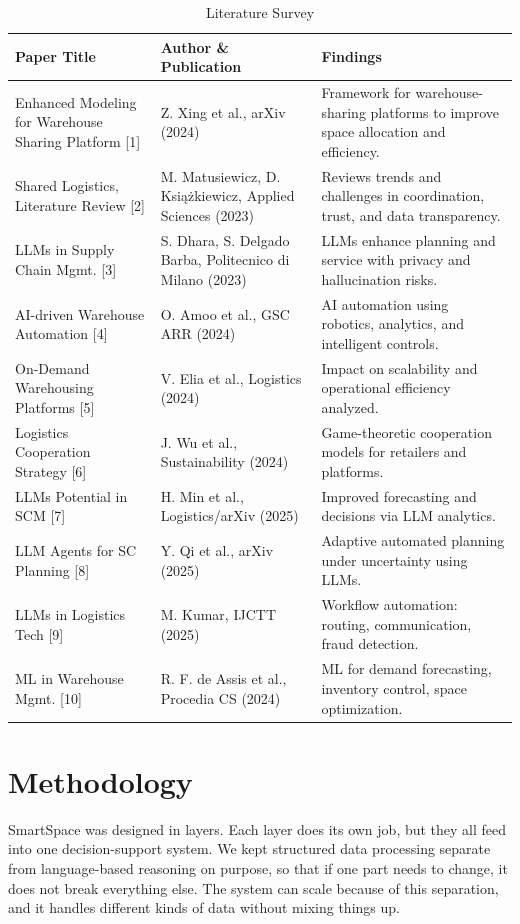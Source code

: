 \documentclass[conference]{IEEEtran}
\begin{document}
\begin{table}[!htbp]
\caption{Literature Survey}
\label{tab:literature_survey}
\centering
\footnotesize
\renewcommand{\arraystretch}{1.2}
\setlength{\tabcolsep}{3pt}
\begin{tabularx}{\columnwidth}{|p{}|p{}|p{}|}
\hline
\textbf{Paper Title} & \textbf{Author \& Publication} & \textbf{Findings} \\
\hline
Enhanced Modeling for Warehouse Sharing Platform [1]
& Z. Xing et al., arXiv (2024)
& Framework for warehouse-sharing platforms to improve space allocation and efficiency. \\
\hline
Shared Logistics, Literature Review [2]
& M. Matusiewicz, D. Ksi\k{a}\.zkiewicz, Applied Sciences (2023)
& Reviews trends and challenges in coordination, trust, and data transparency. \\
\hline
LLMs in Supply Chain Mgmt. [3]
& S. Dhara, S. Delgado Barba, Politecnico di Milano (2023)
& LLMs enhance planning and service with privacy and hallucination risks. \\
\hline
AI-driven Warehouse Automation [4]
& O. Amoo et al., GSC ARR (2024)
& AI automation using robotics, analytics, and intelligent controls. \\
\hline
On-Demand Warehousing Platforms [5]
& V. Elia et al., Logistics (2024)
& Impact on scalability and operational efficiency analyzed. \\
\hline
Logistics Cooperation Strategy [6]
& J. Wu et al., Sustainability (2024)
& Game-theoretic cooperation models for retailers and platforms. \\
\hline
LLMs Potential in SCM [7]
& H. Min et al., Logistics/arXiv (2025)
& Improved forecasting and decisions via LLM analytics. \\
\hline
LLM Agents for SC Planning [8]
& Y. Qi et al., arXiv (2025)
& Adaptive automated planning under uncertainty using LLMs. \\
\hline
LLMs in Logistics Tech [9]
& M. Kumar, IJCTT (2025)
& Workflow automation: routing, communication, fraud detection. \\
\hline
ML in Warehouse Mgmt. [10]
& R. F. de Assis et al., Procedia CS (2024)
& ML for demand forecasting, inventory control, space optimization. \\
\hline
\end{tabularx}
\end{table}

\section{Methodology}
SmartSpace was designed in layers. Each layer does its own job, but they all feed into one decision-support system. We kept structured data processing separate from language-based reasoning on purpose, so that if one part needs to change, it does not break everything else. The system can scale because of this separation, and it handles different kinds of data without mixing things up.
\end{document}
